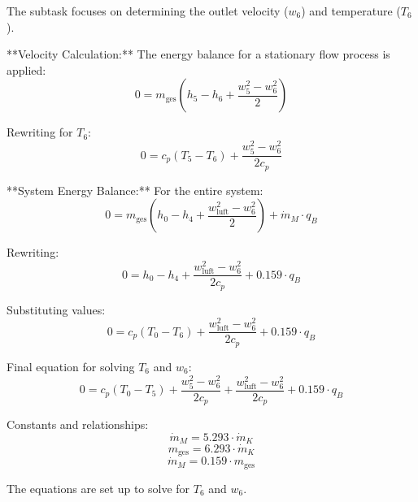 The subtask focuses on determining the outlet velocity (\( w_6 \)) and temperature (\( T_6 \)).  

**Velocity Calculation:**  
The energy balance for a stationary flow process is applied:  
\[
0 = m_{\text{ges}} \left( h_5 - h_6 + \frac{w_5^2 - w_6^2}{2} \right)
\]  

Rewriting for \( T_6 \):  
\[
0 = c_p \left( T_5 - T_6 \right) + \frac{w_5^2 - w_6^2}{2 c_p}
\]  

**System Energy Balance:**  
For the entire system:  
\[
0 = m_{\text{ges}} \left( h_0 - h_4 + \frac{w_{\text{luft}}^2 - w_6^2}{2} \right) + \dot{m}_M \cdot q_B
\]  

Rewriting:  
\[
0 = h_0 - h_4 + \frac{w_{\text{luft}}^2 - w_6^2}{2 c_p} + 0.159 \cdot q_B
\]  

Substituting values:  
\[
0 = c_p \left( T_0 - T_6 \right) + \frac{w_{\text{luft}}^2 - w_6^2}{2 c_p} + 0.159 \cdot q_B
\]  

Final equation for solving \( T_6 \) and \( w_6 \):  
\[
0 = c_p \left( T_0 - T_5 \right) + \frac{w_5^2 - w_6^2}{2 c_p} + \frac{w_{\text{luft}}^2 - w_6^2}{2 c_p} + 0.159 \cdot q_B
\]  

Constants and relationships:  
\[
\dot{m}_M = 5.293 \cdot \dot{m}_K  
\]  
\[
m_{\text{ges}} = 6.293 \cdot \dot{m}_K  
\]  
\[
\dot{m}_M = 0.159 \cdot m_{\text{ges}}  
\]  

The equations are set up to solve for \( T_6 \) and \( w_6 \).